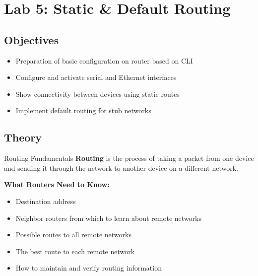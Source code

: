 \documentclass[12pt,a4paper]{article}
\begin{document}
\newpage

\section{Lab 5: Static \& Default Routing}

\subsection{Objectives}
\begin{itemize}[noitemsep]
    \item Preparation of basic configuration on router based on CLI
    \item Configure and activate serial and Ethernet interfaces
    \item Show connectivity between devices using static routes
    \item Implement default routing for stub networks
\end{itemize}

\subsection{Theory}

\begin{theorybox}{Routing Fundamentals}
\textbf{Routing} is the process of taking a packet from one device and sending it through the network to another device on a different network.

\vspace{0.3cm}
\textbf{What Routers Need to Know:}
\begin{itemize}[noitemsep]
    \item Destination address
    \item Neighbor routers from which to learn about remote networks
    \item Possible routes to all remote networks
    \item The best route to each remote network
    \item How to maintain and verify routing information
\end{itemize}
\end{theorybox}
\end{document}

